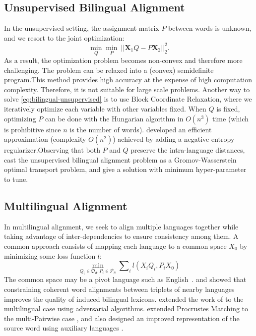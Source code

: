 \documentclass{article}
\newcommand{\OO}{\mathfrak{O}}
\newcommand{\PP}{\mathcal{P}}
\newcommand{\Xv}{\mathbf{X}}
\begin{document}
\subsection{Unsupervised Bilingual Alignment}

In the unsupervised setting, the assignment matrix $P$ between words is unknown, and we resort to the joint optimization:
\begin{equation}
\min_Q \min_P ~||\Xv_1 Q - P \Xv_2||_2^2.
\label{eq:bilingual-unsupervised}
\end{equation}
As a result, the optimization problem becomes non-convex and therefore more challenging. The problem can be relaxed into a (convex) semidefinite program.This method provides high accuracy at the expense of high computation complexity. Therefore, it is not suitable for large scale problems.  Another way to solve \eqref{eq:bilingual-unsupervised} is to use Block Coordinate Relaxation, where we iteratively optimize each variable with other variables fixed.  When $Q$ is fixed, optimizing $P$ can be done with the Hungarian algorithm in $O(n^3)$ time (which is prohibitive since $n$ is the number of words). \citet{cuturi2014fast} developed an efficient approximation (complexity $O(n^2)$) achieved by adding a negative entropy regularizer.Observing that both $P$ and $Q$ preserve the intra-language distances, \citet{AlvarezMelisJaakkola18} cast the unsupervised bilingual alignment problem as a Gromov-Wasserstein optimal transport problem, and give a solution with minimum hyper-parameter to tune.


\subsection{Multilingual Alignment}

In multilingual alignment, we seek to align multiple languages together while taking advantage of inter-dependencies to ensure consistency among them.  A common approach consists of mapping each language to a common space $X_0$ by minimizing some loss function $l$:
\begin{equation}
\label{eq:UMH-all-pairs}
    \min_{Q_i\in \OO_d, P_i\in \PP_n} \sum\nolimits_i l(X_iQ_i,P_iX_0)
\end{equation}
The common space may be a pivot language such as English~\cite{smith2017offline,LampleCRDJ18,JoulinBMJG18}.  \citet{nakashole-flauger-2017-knowledge} and \citet{AlauxGCJ19} showed that constraining coherent word alignments between triplets of nearby languages improves the quality of induced bilingual lexicons.  
\citet{ChenCardie18} extended the work of \cite{LampleCRDJ18} to the multilingual case using adversarial algorithms. \citeauthor{TaitelbaumCG19b} extended Procrustes Matching to the multi-Pairwise case \cite{TaitelbaumCG19a}, and also designed an improved representation of the source word using auxiliary languages \cite{TaitelbaumCG19b}.
 
\end{document}
